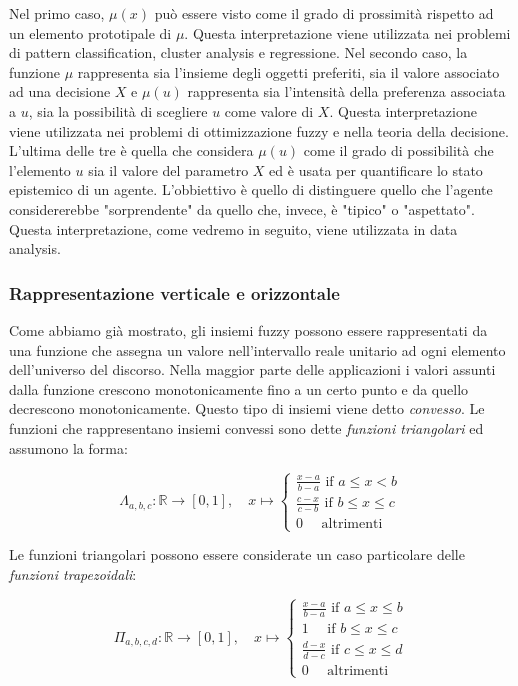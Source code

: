\documentclass[10pt,a4paper]{article}
\begin{document}
Nel primo caso, $\mu(x)$ può essere visto come il grado di prossimità rispetto ad un elemento prototipale di $\mu$. Questa interpretazione viene utilizzata nei problemi di pattern classification, cluster analysis e regressione. Nel secondo caso, la funzione $\mu$ rappresenta sia l'insieme degli oggetti preferiti, sia il valore associato ad una decisione $X$ e $\mu(u)$ rappresenta sia l'intensità della preferenza associata a $u$, sia la possibilità di scegliere $u$ come valore di $X$. Questa interpretazione viene utilizzata nei problemi di ottimizzazione fuzzy e nella teoria della decisione. L'ultima delle tre è quella che considera $\mu(u)$ come il grado di possibilità che l'elemento $u$ sia il valore del parametro $X$ ed è usata per quantificare lo stato epistemico di un agente. L'obbiettivo è quello di distinguere quello che l'agente considererebbe "sorprendente" da quello che, invece, è "tipico" o "aspettato". Questa interpretazione, come vedremo in seguito, viene utilizzata in data analysis.

\subsubsection{Rappresentazione verticale e orizzontale}

Come abbiamo già mostrato, gli insiemi fuzzy possono essere rappresentati da una funzione che assegna un valore nell'intervallo reale unitario ad ogni elemento dell'universo del discorso. Nella maggior parte delle applicazioni i valori assunti dalla funzione crescono monotonicamente fino a un certo punto e da quello decrescono monotonicamente. Questo tipo di insiemi viene detto \emph{convesso}. Le funzioni che rappresentano insiemi convessi sono dette \emph{funzioni triangolari} ed assumono la forma:

$$
\Lambda_{a,b,c} : \mathbb{R} \to [0,1],\quad x \mapsto 
\begin{cases}
\frac{x-a}{b-a} \text{ if } a \leq x < b \\
\frac{c-x}{c-b} \text{ if } b \leq x \leq c \\
0 \quad \text{  altrimenti}
\end{cases}
$$

Le funzioni triangolari possono essere considerate un caso particolare delle \emph{funzioni trapezoidali}:

$$
\Pi_{a,b,c,d} : \mathbb{R} \to [0,1],\quad x \mapsto 
\begin{cases}
\frac{x-a}{b-a} \text{ if } a \leq x \leq b \\
1 \quad \text{ if  }  b \leq x \leq c \\
\frac{d-x}{d-c} \text{ if } c \leq x \leq d \\
0 \quad \text{  altrimenti}
\end{cases}
$$
\end{document}
